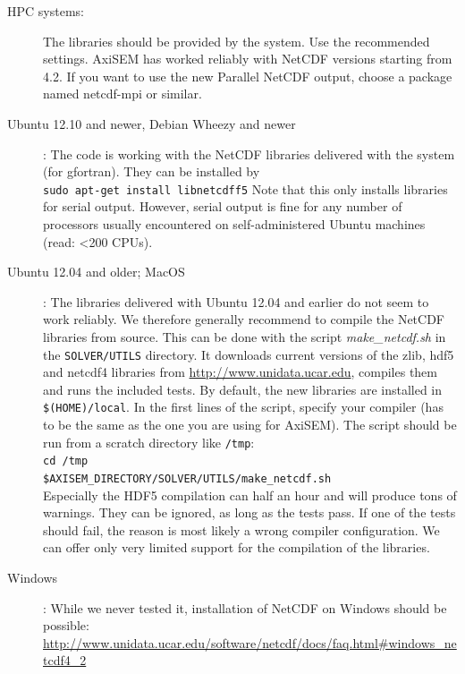 \documentclass{article}
\begin{document}
\begin{description}
    \item[HPC systems:] The libraries should be provided by the system. Use the
          recommended settings. AxiSEM has worked reliably with NetCDF versions starting from 4.2. 
          If you want to use the new Parallel NetCDF output, choose a package named netcdf-mpi 
          or similar.
    \item[Ubuntu 12.10 and newer, Debian Wheezy and newer]: The code is working with the NetCDF libraries delivered
          with the system (for gfortran). They can be installed by \\
          \verb|sudo apt-get install libnetcdff5|
          Note that this only installs libraries for serial output. However, serial output 
          is fine for any number of processors usually encountered on self-administered
          Ubuntu machines (read: <200 CPUs).
    \item[Ubuntu 12.04 and older; MacOS]: The libraries delivered with Ubuntu 12.04 and
          earlier do not seem to work reliably. We therefore generally recommend to
          compile the NetCDF libraries from source. This can be done with the script
          \textit{make\_netcdf.sh} in the \verb|SOLVER/UTILS| directory. It downloads
          current versions of the zlib, hdf5 and netcdf4 libraries from
          \url{http://www.unidata.ucar.edu}, compiles them and runs the included tests. By
          default, the new libraries are installed in \verb|$(HOME)/local|. In the first
          lines of the script, specify your compiler (has to be the same as the one you
          are using for AxiSEM). The script should be run from a scratch directory like
          \verb|/tmp|:\\
          \verb|cd /tmp|\\
          \verb|$AXISEM_DIRECTORY/SOLVER/UTILS/make_netcdf.sh|\\
          Especially the HDF5 compilation can half an hour and will produce tons of warnings. They can be
          ignored, as long as the tests pass. If one of the tests should fail, the reason
          is most likely a wrong compiler configuration. We can offer only very limited
          support for the compilation of the libraries.
    \item[Windows]: While we never tested it, installation of NetCDF on Windows should be
          possible: \url{http://www.unidata.ucar.edu/software/netcdf/docs/faq.html#windows_netcdf4_2}
\end{description}
\end{document}
